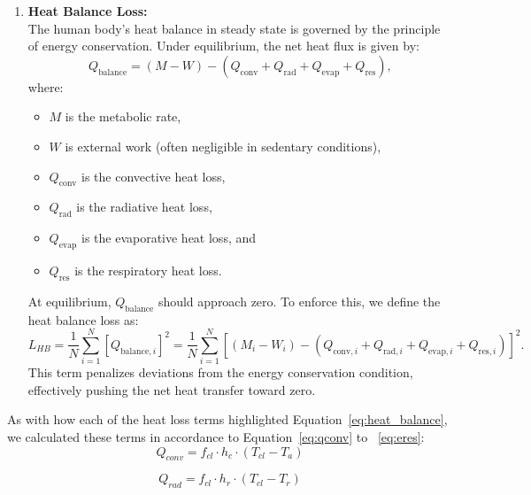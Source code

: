 \begin{enumerate}
    \item \textbf{Heat Balance Loss:} \\
    The human body's heat balance in steady state is governed by the principle of energy conservation. Under equilibrium, the net heat flux is given by:
    \begin{equation}
    Q_{\text{balance}} = (M - W) - \left( Q_{\text{conv}} + Q_{\text{rad}} + Q_{\text{evap}} + Q_{\text{res}} \right),
    \label{eq:heat_balance}%
    \end{equation}
    where:
    \begin{itemize}
        \item $M$ is the metabolic rate,
        \item $W$ is external work (often negligible in sedentary conditions),
        \item $Q_{\text{conv}}$ is the convective heat loss,
        \item $Q_{\text{rad}}$ is the radiative heat loss,
        \item $Q_{\text{evap}}$ is the evaporative heat loss, and
        \item $Q_{\text{res}}$ is the respiratory heat loss.
    \end{itemize}
    At equilibrium, $Q_{\text{balance}}$ should approach zero. To enforce this, we define the heat balance loss as:
    \begin{equation}
    L_{HB} = \frac{1}{N} \sum_{i=1}^{N} \left[ Q_{\text{balance},i} \right]^2 = \frac{1}{N} \sum_{i=1}^{N} \left[ (M_i - W_i) - \left( Q_{\text{conv},i} + Q_{\text{rad},i} + Q_{\text{evap},i} + Q_{\text{res},i} \right) \right]^2.
    \label{eq:hb_loss}
    \end{equation}
    This term penalizes deviations from the energy conservation condition, effectively pushing the net heat transfer toward zero.
    \end{enumerate}

    As with how each of the heat loss terms highlighted Equation~\ref{eq:heat_balance}, we calculated these terms in accordance to Equation~\ref{eq:qconv} to ~\ref{eq:eres}:
    \begin{equation}
        Q_{conv} = f_{cl} \cdot h_c \cdot (T_{cl} - T_a)\label{eq:qconv}
    \end{equation}
    
    \begin{equation}
        Q_{rad} = f_{cl} \cdot h_r \cdot (T_{cl} - T_r)
    \end{equation}
    
